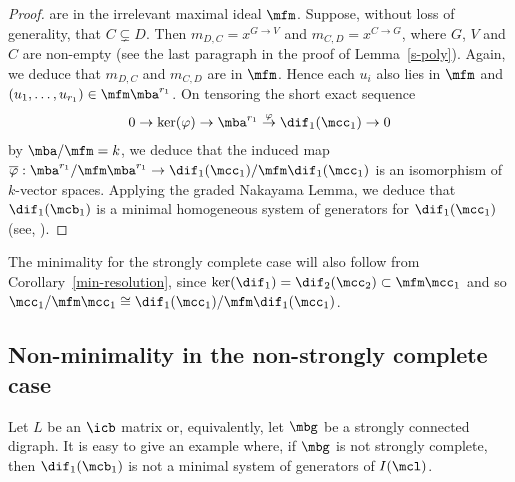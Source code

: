 \begin{proof}
are in the irrelevant maximal ideal $\mfm$. Suppose, without loss of
generality, that $C\subsetneq D$. Then $m_{D,C}=x^{G\to V}$ and
$m_{C,D}=x^{C\to G}$, where $G$, $V$ and $C$ are non-empty (see the
last paragraph in the proof of Lemma~\ref{s-poly}). Again, we deduce
that $m_{D,C}$ and $m_{C,D}$ are in $\mfm$. Hence each $u_i$ also lies
in $\mfm$ and $(u_1,\ldots ,u_{r_1})\in\mfm\mba^{r_1}$. On tensoring
the short exact sequence
\begin{eqnarray*}
0\to\ker(\varphi)\to\mba^{r_1}\buildrel{\varphi}\over{\to}\dif_1(\mcc_1)\to
0 
\end{eqnarray*}
by $\mba/\mfm=k$, we deduce that the induced map
$\overline{\varphi}:\mba^{r_1}/\mfm\mba^{r_1}
\to\dif_1(\mcc_1)/\mfm\dif_1(\mcc_1)$ is an isomorphism of $k$-vector
spaces. Applying the graded Nakayama Lemma, we deduce that
$\dif_1(\mcb_1)$ is a minimal homogeneous system of generators for
$\dif_1(\mcc_1)$ (see, \eg \cite[Exercise~1.5.24]{bh}).
\end{proof}

\begin{remark}
The minimality for the strongly complete case will also follow from
Corollary~\ref{min-resolution}, since
$\ker(\dif_1)=\dif_2(\mcc_2)\subset\mfm\mcc_1$ and so
$\mcc_1/\mfm\mcc_1\cong\dif_1(\mcc_1)/\mfm\dif_1(\mcc_1)$.
\end{remark}

\subsection{Non-minimality in the non-strongly complete case}

 Let $L$ be an $\icb$ matrix or, equivalently, let $\mbg$ be
a strongly connected digraph. It is easy to give an example where, if
$\mbg$ is not strongly complete, then $\dif_1(\mcb_1)$ is not a
minimal system of generators of $I(\mcl)$.

